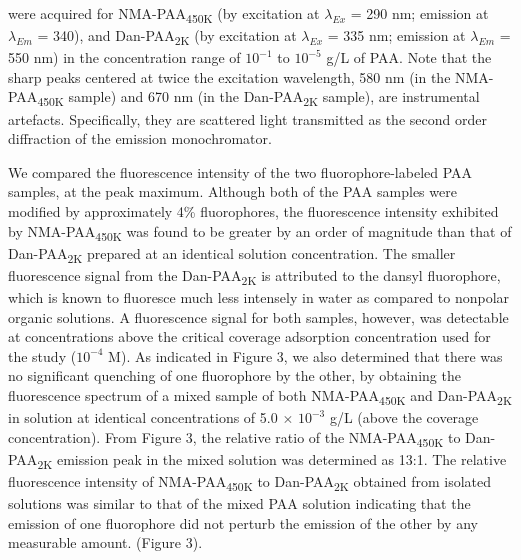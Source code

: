 \documentclass[journal=mamobx,manuscript=article]{achemso}
\begin{document}
were acquired for NMA-PAA\textsubscript{450K} (by excitation at $\lambda_{Ex}$ = 290 nm; emission at $\lambda_{Em}$ = 340),\cite{Anghel1998} and Dan-PAA\textsubscript{2K} (by excitation at $\lambda_{Ex}$ = 335 nm; emission at $\lambda_{Em}$ = 550 nm)\cite{Bednar1985} in the concentration range of $10^{-1}$ to $10^{-5}$ g/L of PAA.  Note that the sharp peaks centered at twice the excitation wavelength, 580 nm (in the NMA-PAA\textsubscript{450K} sample) and 670 nm (in the Dan-PAA\textsubscript{2K} sample), are instrumental artefacts.  Specifically, they are scattered light transmitted as the second order diffraction of the emission monochromator. 

We compared the fluorescence intensity of the two fluorophore-labeled PAA samples, at the peak maximum.  Although both of the PAA samples were modified by approximately 4\% fluorophores, the fluorescence intensity exhibited by NMA-PAA\textsubscript{450K} was found to be greater by an order of magnitude than that of Dan-PAA\textsubscript{2K} prepared at an identical solution concentration.  The smaller fluorescence signal from the Dan-PAA\textsubscript{2K} is attributed to the dansyl fluorophore, which is known to fluoresce much less intensely in water as compared to nonpolar organic solutions.\cite{weber1954fluorescent,Bednar1985,Chen1983}  A fluorescence signal for both samples, however, was detectable at concentrations above the critical coverage adsorption concentration used for the study ($10^{-4}$ M).  As indicated in Figure 3, we also determined that there was no significant quenching of one fluorophore by the other, by obtaining the fluorescence spectrum of a mixed sample of both NMA-PAA\textsubscript{450K} and Dan-PAA\textsubscript{2K} in solution at identical concentrations of 5.0 $\times$ $10^{-3}$ g/L (above the coverage concentration).  From Figure 3, the relative ratio of the NMA-PAA\textsubscript{450K} to Dan-PAA\textsubscript{2K} emission peak in the mixed solution was determined as 13:1.  The relative fluorescence intensity of NMA-PAA\textsubscript{450K} to Dan-PAA\textsubscript{2K} obtained from isolated solutions was similar to that of the mixed PAA solution indicating that the emission of one fluorophore did not perturb the emission of the other by any measurable amount. (Figure 3).
\end{document}
